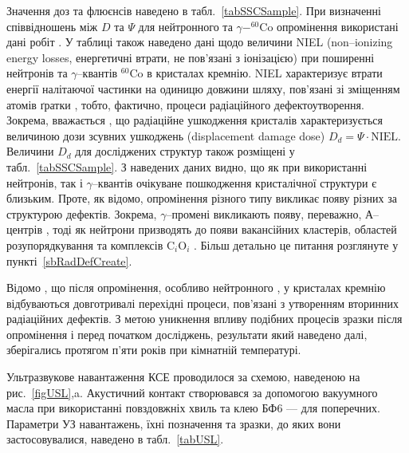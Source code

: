 Значення доз та флюєнсів наведено в табл.~\ref{tabSSCSample}.
При визначенні співвідношень між $D$ та $\Psi$ для нейтронного та $\gamma-^{60}$Co опромінення використані дані робіт \cite{NIEL:Akkerman,Brauning}.
У таблиці також наведено дані щодо величини NIEL (non--ionizing energy losses, енергетичні втрати, не пов'язані з іонізацією) при поширенні нейтронів та $\gamma$--квантів $^{60}$Co в кристалах кремнію.
NIEL характеризує втрати енергії налітаючої частинки на одиницю довжини шляху, пов'язані зі зміщенням атомів ґратки \cite{NIEL:Huhtinen,NIEL:Messenger}, тобто, фактично, процеси радіаційного дефектоутворення.
Зокрема, вважається \cite{NIEL:Messenger}, що радіаційне ушкодження кристалів характеризується величиною дози зсувних ушкоджень (displacement damage dose) $D_d=\Psi\cdot \mbox{NIEL}$.
Величини $D_d$ для досліджених структур також розміщені у табл.~\ref{tabSSCSample}.
З наведених даних видно, що як при використанні нейтронів, так і $\gamma$--квантів очікуване пошкодження кристалічної структури є близьким.
Проте, як відомо,  опромінення різного типу викликає появу різних за структурою дефектів.
Зокрема, $\gamma$--промені викликають появу, переважно, А--центрів \cite{NIEL:Jafari,Gamma:Prabhakara,NIEL:Moll}, тоді як нейтрони призводять до появи вакансійних кластерів\cite{Rew:Srour,Junkes}, областей розупорядкування  \cite{Neutron:Arutyunov} та комплексів C$_i$O$_i$ \cite{NIEL:Moll,neutron:Londos}.
Більш детально це питання розглянуте у пункті~\ref{sbRadDefCreate}.

Відомо \cite{RadBook}, що після опромінення, особливо нейтронного \cite{NIEL:Moll,Rew:Srour}, у кристалах кремнію відбуваються довготривалі перехідні процеси, пов'язані з утворенням вторинних радіаційних дефектів.
З метою уникнення впливу подібних процесів зразки після опромінення і перед початком досліджень, результати який наведено далі, зберігались протягом п'яти років при кімнатній температурі.


Ультразвукове навантаження КСЕ проводилося за схемою, наведеною на рис.~\ref{figUSL},a.
Акустичний контакт створювався за допомогою вакуумного масла при використанні повздовжніх хвиль та клею БФ6 --- для поперечних.
Параметри УЗ навантажень, їхні позначення та зразки, до яких вони застосовувалися, наведено в табл.~\ref{tabUSL}.

